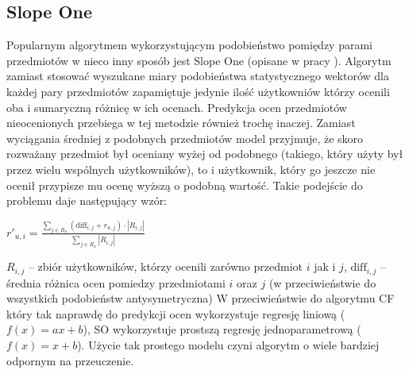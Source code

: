 \documentclass{pracamgr}
\begin{document}
   \subsection{Slope One}
    Popularnym algorytmem wykorzystującym podobieństwo pomiędzy parami przedmiotów w nieco inny sposób jest Slope One (opisane w pracy \cite{SO}).
    Algorytm zamiast stosować wyszukane miary podobieństwa statystycznego wektorów dla każdej pary przedmiotów zapamiętuje jedynie ilość
    użytkowniów którzy ocenili oba i sumaryczną różnicę w ich ocenach.\newline
    Predykcja ocen przedmiotów nieocenionych przebiega w tej metodzie również trochę inaczej.
    Zamiast wyciągania średniej z podobnych przedmiotów model przyjmuje,
    że skoro rozważany przedmiot był oceniany wyżej od podobnego (takiego, który użyty był przez wielu wspólnych użytkowników),
    to i użytkownik, który go jeszcze nie ocenił przypisze mu ocenę wyższą o podobną wartość.
    Takie podejście do problemu daje następujący wzór:\newline
    \begin{center}
     $r'_{u,i}=\frac{\sum\limits_{j\in R_u}(\text{diff}_{i,j}+r_{u,j})\cdot|R_{i,j}|}{\sum\limits_{j\in R_u}|R_{i,j}|}$
    \end{center}
    {\scriptsize
     $R_{i,j}$ -- zbiór użytkowników, którzy ocenili zarówno przedmiot $i$ jak i $j$,\newline
     $\text{diff}_{i,j}$ -- średnia różnica ocen pomiedzy przedmiotami $i$ oraz $j$ (w przeciwieństwie do wszystkich podobieństw antysymetryczna)
    }\newline
    W przeciwieństwie do algorytmu CF który tak naprawdę do predykcji ocen wykorzystuje regresję liniową ($f(x)=ax+b$),
    SO wykorzystuje prostszą regresję jednoparametrową ($f(x)=x+b$). Użycie tak prostego modelu czyni algorytm o wiele bardziej odpornym na przeuczenie.
\end{document}
